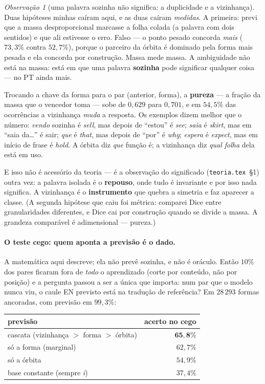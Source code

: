\documentclass[11pt,a4paper]{article}
\theoremstyle{remark}
\newtheorem{obs}{Observação}
\begin{document}
\begin{obs}[uma palavra sozinha não significa: a duplicidade e a vizinhança]\label{obs:vizinhanca}
Duas hipóteses minhas caíram aqui, e as duas caíram \emph{medidas}. A primeira: previ que a massa
desproporcional marcasse a folha colada (a palavra com dois sentidos) e que ali estivesse o erro. Falso
--- o ponto pesado concorda \emph{mais} ($73{,}3\%$ contra $52{,}7\%$), porque o parceiro da órbita é
dominado pela forma mais pesada e ela concorda por construção. Massa mede massa. A ambiguidade não está
na massa: está em que uma palavra \textbf{sozinha} pode significar qualquer coisa --- no PT ainda mais.

Trocando a chave da forma para o par (anterior, forma), a \textbf{pureza} --- a fração da massa que o
vencedor toma --- sobe de $0{,}629$ para $0{,}701$, e em $54{,}5\%$ das ocorrências a vizinhança
\emph{muda} a resposta. Os exemplos dizem melhor que o número: \emph{vendo} sozinha é \emph{sell}, mas
depois de ``estou'' é \emph{see}; \emph{saia} é \emph{skirt}, mas em ``saia da\ldots'' é sair;
\emph{que} é \emph{that}, mas depois de ``por'' é \emph{why}; \emph{espera} é \emph{expect}, mas em
início de frase é \emph{hold}. A órbita diz \emph{que} função é; a vizinhança diz \emph{qual folha} dela
está em uso.

E isso não é acessório da teoria --- é a observação do significado (\texttt{teoria.tex}~§1) outra vez: a
palavra isolada é o \textbf{repouso}, onde tudo é invariante e por isso nada significa. A vizinhança é o
\textbf{instrumento} que quebra a simetria e faz aparecer a classe. (A segunda hipótese que caiu foi
métrica: comparei Dice entre granularidades diferentes, e Dice cai por construção quando se divide a
massa. A grandeza comparável é adimensional --- pureza.)
\end{obs}

\paragraph{O teste cego: quem aponta a previsão é o dado.} A matemática aqui descreve; ela não prevê
sozinha, e não é oráculo. Então $10\%$ dos pares ficaram fora de \emph{todo} o aprendizado (corte por
conteúdo, não por posição) e a pergunta passou a ser a única que importa: num par que o modelo nunca
viu, o caule EN previsto está na tradução de referência? Em $28\,293$ formas ancoradas, com previsão em
$99{,}3\%$:

\begin{center}\small
\begin{tabular}{lr}
\toprule
previsão & acerto no cego \\
\midrule
cascata (vizinhança $>$ forma $>$ órbita) & $\mathbf{65{,}8\%}$ \\
só a forma (marginal)                     & $62{,}7\%$ \\
só a órbita                               & $54{,}9\%$ \\
base constante (sempre \emph{i})          & $37{,}4\%$ \\
\bottomrule
\end{tabular}
\end{center}
\end{document}
